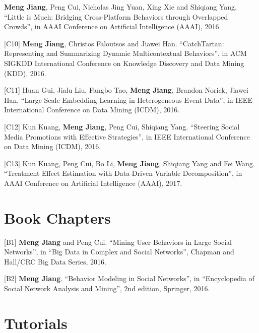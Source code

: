 \documentclass[margin, 10pt]{res}
\begin{document}
\begin{resume}
[C9] \textbf{Meng Jiang}, Peng Cui, Nicholas Jing Yuan, Xing Xie and Shiqiang Yang. ``Little is Much: Bridging Cross-Platform Behaviors through Overlapped Crowds'', in AAAI Conference on Artificial Intelligence (AAAI), 2016.

[C10] \textbf{Meng Jiang}, Christos Faloutsos and Jiawei Han. ``CatchTartan: Representing and Summarizing Dynamic Multicontextual Behaviors'', in ACM SIGKDD International Conference on Knowledge Discovery and Data Mining (KDD), 2016.

[C11] Huan Gui, Jialu Liu, Fangbo Tao, \textbf{Meng Jiang}, Brandon Norick, Jiawei Han. ``Large-Scale Embedding Learning in Heterogeneous Event Data'', in IEEE International Conference on Data Mining (ICDM), 2016.

[C12] Kun Kuang, \textbf{Meng Jiang}, Peng Cui, Shiqiang Yang. ``Steering Social Media Promotions with Effective Strategies'', in IEEE International Conference on Data Mining (ICDM), 2016.

[C13] Kun Kuang, Peng Cui, Bo Li, \textbf{Meng Jiang}, Shiqiang Yang and Fei Wang. ``Treatment Effect Estimation with Data-Driven Variable Decomposition'', in AAAI Conference on Artificial Intelligence (AAAI), 2017.


\section{Book Chapters}

[B1] \textbf{Meng Jiang} and Peng Cui. ``Mining User Behaviors in Large Social Networks'', in ``Big Data in Complex and Social Networks'', Chapman and Hall/CRC Big Data Series, 2016.

[B2] \textbf{Meng Jiang}. ``Behavior Modeling in Social Networks'', in ``Encyclopedia of Social Network Analysis and Mining'', 2nd edition, Springer, 2016.


\section{Tutorials}


\end{resume}
\end{document}
